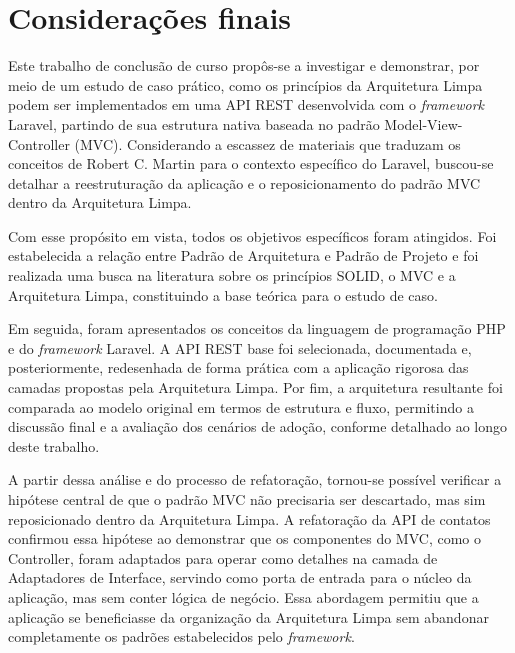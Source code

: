 \chapter{Considerações finais}
\thispagestyle{headings} %

    \par Este trabalho de conclusão de curso propôs-se a investigar e demonstrar, por meio de um estudo de caso prático, como os princípios da Arquitetura Limpa podem ser implementados em uma API REST desenvolvida com o \textit{framework} Laravel, partindo de sua estrutura nativa baseada no padrão Model-View-Controller (MVC). Considerando a escassez de materiais que traduzam os conceitos de Robert C. Martin para o contexto específico do Laravel, buscou-se detalhar a reestruturação da aplicação e o reposicionamento do padrão MVC dentro da Arquitetura Limpa.
    
    \par Com esse propósito em vista, todos os objetivos específicos foram atingidos. Foi estabelecida a relação entre Padrão de Arquitetura e Padrão de Projeto e foi realizada uma busca na literatura sobre os princípios SOLID, o MVC e a Arquitetura Limpa, constituindo a base teórica para o estudo de caso.

    \par Em seguida, foram apresentados os conceitos da linguagem de programação PHP e do \textit{framework} Laravel. A API REST base foi selecionada, documentada e, posteriormente, redesenhada de forma prática com a aplicação rigorosa das camadas propostas pela Arquitetura Limpa. Por fim, a arquitetura resultante foi comparada ao modelo original em termos de estrutura e fluxo, permitindo a discussão final e a avaliação dos cenários de adoção, conforme detalhado ao longo deste trabalho.

    \par A partir dessa análise e do processo de refatoração, tornou-se possível verificar a hipótese central de que o padrão MVC não precisaria ser descartado, mas sim reposicionado dentro da Arquitetura Limpa. A refatoração da API de contatos confirmou essa hipótese ao demonstrar que os componentes do MVC, como o Controller, foram adaptados para operar como detalhes na camada de Adaptadores de Interface, servindo como porta de entrada para o núcleo da aplicação, mas sem conter lógica de negócio. Essa abordagem permitiu que a aplicação se beneficiasse da organização da Arquitetura Limpa sem abandonar completamente os padrões estabelecidos pelo \textit{framework}.

